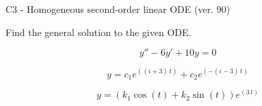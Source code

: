 \begin{exercise}
  \begin{exerciseTitle}C3 - Homogeneous second-order linear ODE (ver. 90)\end{exerciseTitle}
  \begin{exerciseStatement}
    
Find the general solution to the given ODE.

    
\[y''-6y'+10y = 0\]

  \end{exerciseStatement}
  \begin{exerciseAnswer}
    
\[y= c_{1} e^{\left(\left(i + 3\right) \, t\right)} + c_{2} e^{\left(-\left(i - 3\right) \, t\right)}\]

    
\[y= {\left(k_{1} \cos\left(t\right) + k_{2} \sin\left(t\right)\right)} e^{\left(3 \, t\right)}\]

  \end{exerciseAnswer}
\end{exercise}